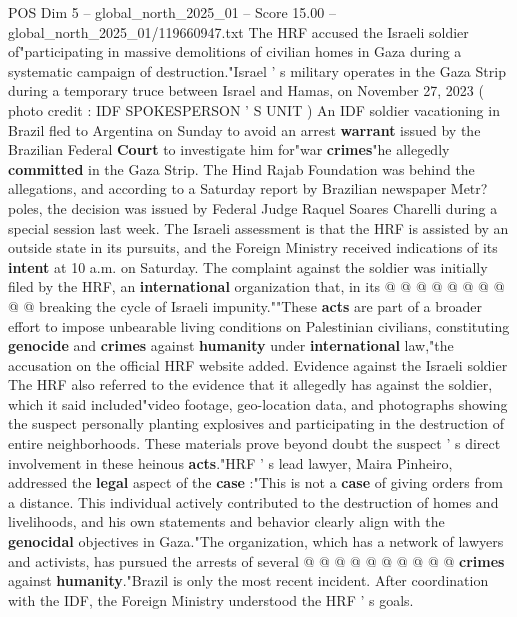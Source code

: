 \begin{textsample}{POS Dim 5 – global\_north\_2025\_01 – Score 15.00 – global\_north\_2025\_01/119660947.txt}  \label{ex:f5_pos_269}
The HRF accused the Israeli soldier of"participating in massive demolitions of civilian homes in Gaza during a systematic campaign of destruction."Israel ' s military operates in the Gaza Strip during a temporary truce between Israel and Hamas, on November 27, 2023 ( photo credit : IDF SPOKESPERSON ' S UNIT ) An IDF soldier vacationing in Brazil fled to Argentina on Sunday to avoid an arrest \textbf{warrant} issued by the Brazilian Federal \textbf{Court} to investigate him for"war \textbf{crimes}"he allegedly \textbf{committed} in the Gaza Strip.
The Hind Rajab Foundation was behind the allegations, and according to a Saturday report by Brazilian newspaper Metr? poles, the decision was issued by Federal Judge Raquel Soares Charelli during a special session last week.
The Israeli assessment is that the HRF is assisted by an outside state in its pursuits, and the Foreign Ministry received indications of its \textbf{intent} at 10 a.m. on Saturday.
The complaint against the soldier was initially filed by the HRF, an \textbf{international} organization that, in its @ @ @ @ @ @ @ @ @ @ breaking the cycle of Israeli impunity.""These \textbf{acts} are part of a broader effort to impose unbearable living conditions on Palestinian civilians, constituting \textbf{genocide} and \textbf{crimes} against \textbf{humanity} under \textbf{international} law,"the accusation on the official HRF website added.
Evidence against the Israeli soldier The HRF also referred to the evidence that it allegedly has against the soldier, which it said included"video footage, geo-location data, and photographs showing the suspect personally planting explosives and participating in the destruction of entire neighborhoods.
These materials prove beyond doubt the suspect ' s direct involvement in these heinous \textbf{acts}."HRF ' s lead lawyer, Maira Pinheiro, addressed the \textbf{legal} aspect of the \textbf{case} :"This is not a \textbf{case} of giving orders from a distance.
This individual actively contributed to the destruction of homes and livelihoods, and his own statements and behavior clearly align with the \textbf{genocidal} objectives in Gaza."The organization, which has a network of lawyers and activists, has pursued the arrests of several @ @ @ @ @ @ @ @ @ @ \textbf{crimes} against \textbf{humanity}."Brazil is only the most recent incident.
After coordination with the IDF, the Foreign Ministry understood the HRF ' s goals.

\end{textsample}
